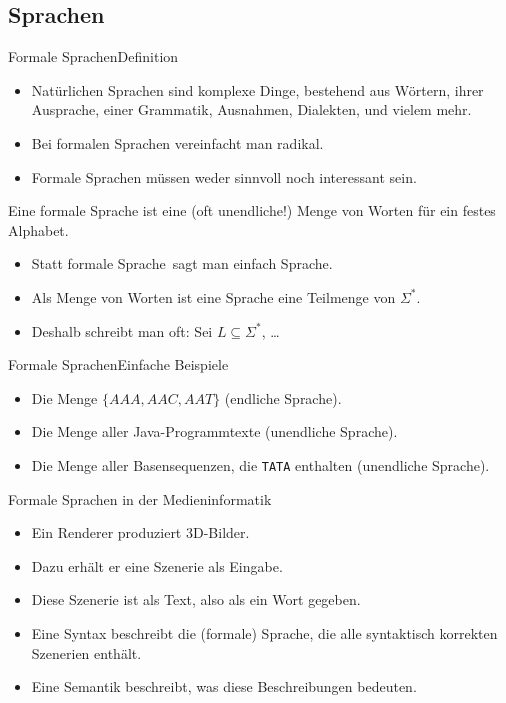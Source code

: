 \subsection{Sprachen}

\begin{frame}{Formale Sprachen}{Definition}
  \begin{itemize}
  \item Natürlichen Sprachen sind komplexe Dinge, bestehend aus
    Wörtern, ihrer Ausprache, einer Grammatik, Ausnahmen, Dialekten,
    und vielem mehr.
  \item Bei \alert{formalen Sprachen} vereinfacht man radikal.
  \item Formale Sprachen müssen weder sinnvoll noch interessant sein.      
  \end{itemize}

  \begin{definition}
    Eine \alert{formale Sprache} ist eine (oft unendliche!) Menge von
    Worten für ein festes Alphabet.
  \end{definition}

  \begin{itemize}
  \item Statt \frqq formale Sprache\flqq\ sagt man einfach \frqq Sprache\flqq.
  \item Als Menge von Worten ist eine Sprache eine Teilmenge von
    $\Sigma^*$.
  \item 
    Deshalb schreibt man oft: \frqq Sei $L \subseteq \Sigma^*$,
    \dots\flqq
  \end{itemize}
\end{frame}

\begin{frame}{Formale Sprachen}{Einfache Beispiele}
  \begin{examples}
    \begin{itemize}
    \item Die Menge $\{AAA, AAC, AAT\}$ (endliche Sprache).
    \item Die Menge aller Java-Programmtexte (unendliche Sprache).
    \item Die Menge aller Basensequenzen, die \texttt{TATA} enthalten
      (unendliche Sprache).
    \end{itemize}
  \end{examples} 
\end{frame}

\begin{frame}{Formale Sprachen in der Medieninformatik}
  \begin{itemize}
  \item Ein Renderer produziert 3D-Bilder.
  \item Dazu erhält er eine \alert{Szenerie} als Eingabe.
  \item Diese Szenerie ist als \alert{Text}, also als ein \alert{Wort} gegeben.
  \item Eine \alert{Syntax} beschreibt die (formale) Sprache, die alle
    \alert{syntaktisch korrekten Szenerien}  enthält.
  \item Eine \alert{Semantik} beschreibt, was diese Beschreibungen bedeuten.
  \end{itemize}
\end{frame}

